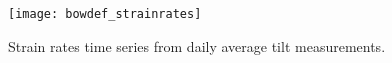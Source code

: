 \documentclass[utf8]{article}
\begin{document}







\clearpage

    \begin{figure}
      \centerline{\texttt{[image: bowdef\_strainrates]}}
      \caption{%
          Strain rates time series from daily average tilt measurements.}
      \label{fig:strainrates}
    \end{figure}



\end{document}
